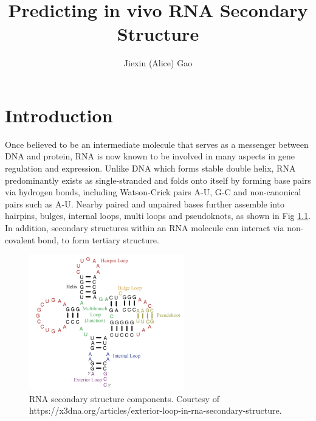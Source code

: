 \documentclass{proposal}
\author{Jiexin (Alice) Gao}
\title{Predicting in vivo RNA Secondary Structure}
\begin{document}
\begin{preliminary}

\maketitle

%
%
%

\tableofcontents

\end{preliminary}





\chapter{Introduction}




Once believed to be an intermediate molecule that serves as a messenger between DNA and protein,
RNA is now known to be involved in many aspects in gene regulation and expression.
Unlike DNA which forms stable double helix, RNA predominantly exists as single-stranded and folds onto itself by
forming base pairs via hydrogen bonds, including Watson-Crick pairs A-U, G-C and non-canonical pairs such as A-U.
Nearby paired and unpaired bases further assemble into
hairpins, bulges, internal loops, multi loops and pseudoknots, as shown in Fig \ref{fig:rna_structure_components}.
In addition, secondary structures within an RNA molecule can interact via non-covalent bond, to form tertiary structure.

\begin{figure}[h!]
    \centering
    \includegraphics[width=0.6\textwidth]{rna_structure_components.png}
    \caption{RNA secondary structure components. Courtesy of https://x3dna.org/articles/exterior-loop-in-rna-secondary-structure.}
    \label{fig:rna_structure_components}
    \centering
\end{figure}
\end{document}
